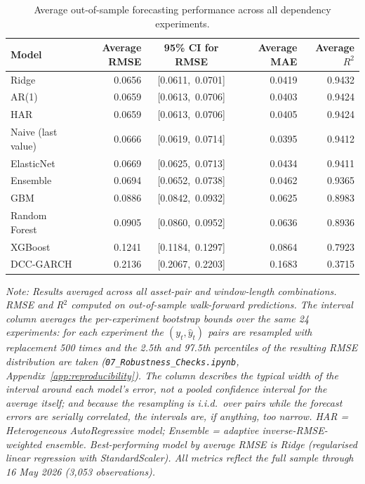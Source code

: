 \begin{table}[H]
    \centering
    \caption{Average out-of-sample forecasting performance across all dependency experiments.}
    \label{tab:model_ranking_summary}
    \begin{tabular}{lrcrr}
        \toprule
        Model & Average RMSE & 95\% CI for RMSE & Average MAE & Average $R^2$ \\
        \midrule
        Ridge             & 0.0656 & [0.0611,\ 0.0701] & 0.0419 & 0.9432 \\
        AR(1)             & 0.0659 & [0.0613,\ 0.0706] & 0.0403 & 0.9424 \\
        HAR               & 0.0659 & [0.0613,\ 0.0706] & 0.0405 & 0.9424 \\
        Naive (last value) & 0.0666 & [0.0619,\ 0.0714] & 0.0395 & 0.9412 \\
        ElasticNet        & 0.0669 & [0.0625,\ 0.0713] & 0.0434 & 0.9411 \\
        Ensemble          & 0.0694 & [0.0652,\ 0.0738] & 0.0462 & 0.9365 \\
        GBM               & 0.0886 & [0.0842,\ 0.0932] & 0.0625 & 0.8983 \\
        Random Forest     & 0.0905 & [0.0860,\ 0.0952] & 0.0636 & 0.8936 \\
        XGBoost           & 0.1241 & [0.1184,\ 0.1297] & 0.0864 & 0.7923 \\
        DCC-GARCH         & 0.2136 & [0.2067,\ 0.2203] & 0.1683 & 0.3715 \\
        \bottomrule
    \end{tabular}
    \par\smallskip\noindent\footnotesize{\textit{Note: Results averaged across all asset-pair and window-length combinations. RMSE and R$^2$ computed on out-of-sample walk-forward predictions. The interval column averages the per-experiment bootstrap bounds over the same 24 experiments: for each experiment the $(y_t, \hat{y}_t)$ pairs are resampled with replacement 500 times and the 2.5th and 97.5th percentiles of the resulting RMSE distribution are taken (\texttt{07\_Robustness\_Checks.ipynb}, Appendix~\ref{app:reproducibility}). The column describes the typical width of the interval around each model's error, not a pooled confidence interval for the average itself; and because the resampling is i.i.d.\ over pairs while the forecast errors are serially correlated, the intervals are, if anything, too narrow. HAR = Heterogeneous AutoRegressive model; Ensemble = adaptive inverse-RMSE-weighted ensemble. Best-performing model by average RMSE is Ridge (regularised linear regression with StandardScaler). All metrics reflect the full sample through 16 May 2026 (3{,}053 observations).}}
\end{table}

